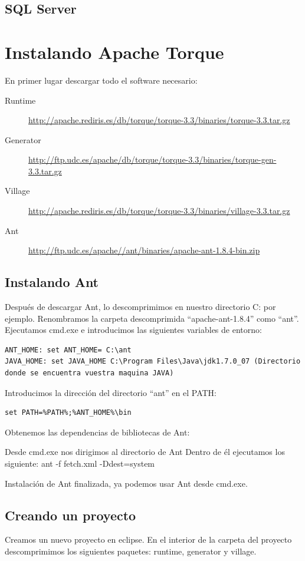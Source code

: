 \documentclass[12pt, oneside]{article}
\begin{document}
\subsection{SQL Server}

\section{Instalando Apache Torque}
En primer lugar descargar todo el software necesario:

\begin{description}
	\item[Runtime] \url{http://apache.rediris.es/db/torque/torque-3.3/binaries/torque-3.3.tar.gz}
	\item[Generator] \url{http://ftp.udc.es/apache/db/torque/torque-3.3/binaries/torque-gen-3.3.tar.gz}
	\item[Village] \url{http://apache.rediris.es/db/torque/torque-3.3/binaries/village-3.3.tar.gz}
	\item[Ant] \url{http://ftp.udc.es/apache//ant/binaries/apache-ant-1.8.4-bin.zip}
\end{description}

\subsection{Instalando Ant}
Después de descargar Ant, lo descomprimimos en nuestro directorio C: por ejemplo.
Renombramos la carpeta descomprimida “apache-ant-1.8.4” como “ant”.
Ejecutamos cmd.exe e introducimos las siguientes variables de entorno:

\begin{lstlisting}
ANT_HOME: set ANT_HOME= C:\ant
JAVA_HOME: set JAVA_HOME C:\Program Files\Java\jdk1.7.0_07 (Directorio donde se encuentra vuestra maquina JAVA)
\end{lstlisting}

Introducimos la dirección del directorio “ant” en el PATH:
\begin{lstlisting}
set PATH=%PATH%;%ANT_HOME%\bin
\end{lstlisting}

Obtenemos las dependencias de bibliotecas de Ant:

Desde cmd.exe nos dirigimos al directorio de Ant
Dentro de él ejecutamos los siguiente:  ant -f fetch.xml -Ddest=system

Instalación de Ant finalizada, ya podemos usar Ant desde cmd.exe.

\subsection{Creando un proyecto}
Creamos un nuevo proyecto en eclipse.
En el interior de la carpeta del proyecto descomprimimos los siguientes paquetes: runtime, generator y village.
\end{document}
